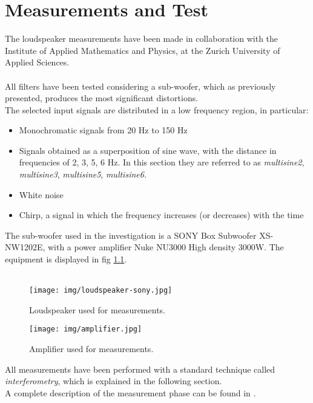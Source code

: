 \chapter{Measurements and Test}
The loudspeaker measurements have been made in collaboration with the Institute of Applied Mathematics and Physics, at the Zurich University of Applied Sciences.\\\\
All filters have been tested considering a sub-woofer, which as previously presented, produces the most significant distortions.\\
The selected input signals are distributed in a low frequency region, in particular:
\begin{itemize}
\item Monochromatic signals from 20 Hz to 150 Hz
\item Signals obtained as a superposition of sine wave, with the distance in frequencies of 2, 3, 5, 6 Hz. In this section they are referred to as \textit{multisine2}, \textit{multisine3}, \textit{multisine5}, \textit{multisine6}.
\item White noise
\item Chirp, a signal in which the frequency increases (or decreases) with the time
\end{itemize}
The sub-woofer used in the investigation is a SONY Box Subwoofer XS- NW1202E, with a power amplifier Nuke NU3000 High density 3000W. The equipment is displayed in fig \ref{fig:loud-amplifier}.\\\\
\begin{figure}[h]\centering
\texttt{[image: img/loudspeaker-sony.jpg]}
\caption{Loudspeaker used for measurements.}
\end{figure}
\begin{figure}[h]\centering
\texttt{[image: img/amplifier.jpg]}
\caption{Amplifier used for measurements.} \label{fig:loud-amplifier}
\end{figure}
All measurements have been performed with a standard technique called \textit{interferometry}, which is explained in the following section.\\
A complete description of the measurement phase can be found in \cite{measurementsreport}.

